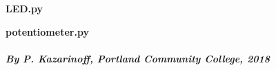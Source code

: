 \documentclass[11pt]{article}
\begin{document}
\textbf{LED.py}

\textbf{potentiometer.py}

    \hypertarget{by-p.-kazarinoff-portland-community-college-2018}{%
\paragraph{\texorpdfstring{\emph{By P. Kazarinoff, Portland Community
College,
2018}}{By P. Kazarinoff, Portland Community College, 2018}}\label{by-p.-kazarinoff-portland-community-college-2018}}


    
    
    
    
\end{document}
